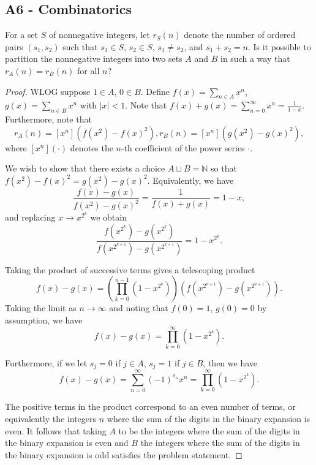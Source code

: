 \documentclass[11pt]{scrartcl}
\newcommand{\N}{\mathbb{N}}
\newcommand{\<}{\langle}
\renewcommand{\>}{\rangle}
\begin{document}
\subsection{A6 - Combinatorics}
	For a set $S$ of nonnegative integers, let $r_S(n)$ denote the number of ordered pairs $(s_1, s_2)$ such that $s_1 \in S$, $s_2 \in S$, $s_1 \neq s_2$, and $s_1 + s_2 = n$. Is it possible to partition the nonnegative integers into two sets $A$ and $B$ in such a way that $r_A(n) = r_B(n)$ for all $n$?
\begin{proof}
WLOG suppose $1 \in A$, $0 \in B$.  Define $f(x) = \sum_{n \in A} x^n$,  $g(x) = \sum_{n \in B} x^n$ with $|x| < 1$.  Note that $f(x) + g(x) = \sum_{n=0}^\infty x^n = \frac{1}{1-x}$.  Furthermore, note that 
$$r_A(n) = [x^n] (f(x^2) - f(x)^2), r_B(n) = [x^n] (g(x^2) - g(x)^2),$$
where $[x^n](\cdot)$ denotes the $n$-th coefficient of the power series $\cdot$.  

We wish to show that there exists a choice $A \sqcup B = \N$ so that $f(x^2) - f(x)^2 = g(x^2) - g(x)^2$.  Equivalently, we have 
$$\frac{f(x) - g(x)}{f(x^2) - g(x)^2} = \frac{1}{f(x) + g(x)} = 1 - x,$$
and replacing $x \to x^{2^k}$ we obtain
$$\frac{f(x^{2^k}) - g(x^{2^k})}{f(x^{2^{k+1}} ) - g(x^{2^{k+1}})} = 1-x^{2^{k}}.$$

Taking the product of successive terms gives a telescoping product
$$f(x) - g(x) = \left(\prod_{k=0}^{n-1} (1 - x^{2^k}) \right) (f(x^{2^{n + 1}} ) - g(x^{2^{n+1}})).$$
Taking the limit as $n \to \infty$ and noting that $f(0) = 1$, $g(0) = 0$ by assumption, we have 
$$f(x) - g(x) = \prod_{k=0}^\infty (1 - x^{2^k}).$$

Furthermore, if we let $s_j = 0$ if $j \in A$, $s_j =1$ if $j \in B$, then we have 
$$f(x) - g(x) = \sum_{n=0}^\infty (-1)^{s_n} x^n = \prod_{k=0}^{\infty} (1-x^{2^k}).$$

The positive terms in the product correspond to an even number of terms, or equivalently the integers $n$ where the sum of the digits in the binary expansion is even.  It follows that taking $A$ to be the integers where the sum of the digits in the binary expansion is even and $B$ the integers where the sum of the digits in the binary expansion is odd satisfies the problem statement.
\end{proof}
\pagebreak
\end{document}
